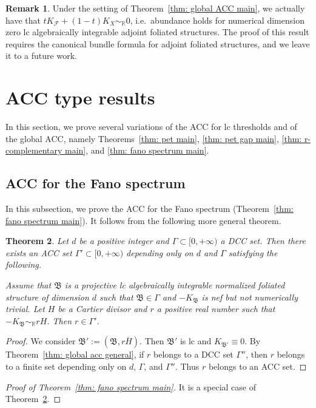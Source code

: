 \documentclass[11pt,reqno]{amsart}
\numberwithin{equation}{section}
\newcommand{\Bb}{{\mathfrak{B}}}
\newcommand{\Ff}{\mathcal{F}}
\newcommand{\Ii}{\Gamma}
\newtheorem{thm}{Theorem}[section]
\theoremstyle{definition}
\newtheorem{rem}[thm]{Remark}
\begin{document}
\begin{rem}
Under the setting of Theorem~\ref{thm: global ACC main}, we actually have that $tK_{\Ff}+(1-t)K_X\sim_{\mathbb R}0$, i.e.\ abundance holds for numerical dimension zero lc algebraically integrable adjoint foliated structures. The proof of this result requires the canonical bundle formula for adjoint foliated structures, and we leave it to a future work.
\end{rem}




\section{ACC type results}\label{sec: acc type results}

In this section, we prove several variations of the ACC for lc thresholds and of the global ACC, namely Theorems~\ref{thm: pet main}, \ref{thm: pet gap main}, \ref{thm: r-complementary main}, and \ref{thm: fano spectrum main}.

\subsection{ACC for the Fano spectrum}
In this subsection, we prove the ACC for the Fano spectrum (Theorem~\ref{thm: fano spectrum main}). It follows from the following more general theorem.

\begin{thm}\label{thm: fano spectrum general}
    Let $d$ be a positive integer and $\Ii\subset [0,+\infty)$ a DCC set. Then there exists an ACC set $\Ii'\subset [0,+\infty)$ depending only on $d$ and $\Ii$ 
  satisfying the following. 
    
    Assume that $\Bb$ is a projective lc algebraically integrable normalized foliated structure of dimension $d$ such that $\Bb\in\Ii$ and $-K_{\Bb}$ is nef but not numerically trivial. Let $H$ be a Cartier divisor and $r$ a positive real number such that $-K_{\Bb}\sim_{\mathbb R}rH$. Then $r\in\Ii'$.
\end{thm}

\begin{proof}
We consider $\Bb':=(\Bb,r\overline{H})$. Then $\Bb'$ is lc and $K_{\Bb'}\equiv 0$. By Theorem~\ref{thm: global acc general}, if $r$ belongs to a DCC set $\Ii''$, then $r$ belongs to a finite set depending only on $d$, $\Ii$, and $\Ii''$. Thus $r$ belongs to an ACC set. 
\end{proof}

\begin{proof}[Proof of Theorem~\ref{thm: fano spectrum main}]
    It is a special case of Theorem~\ref{thm: fano spectrum general}.
\end{proof}
\end{document}
